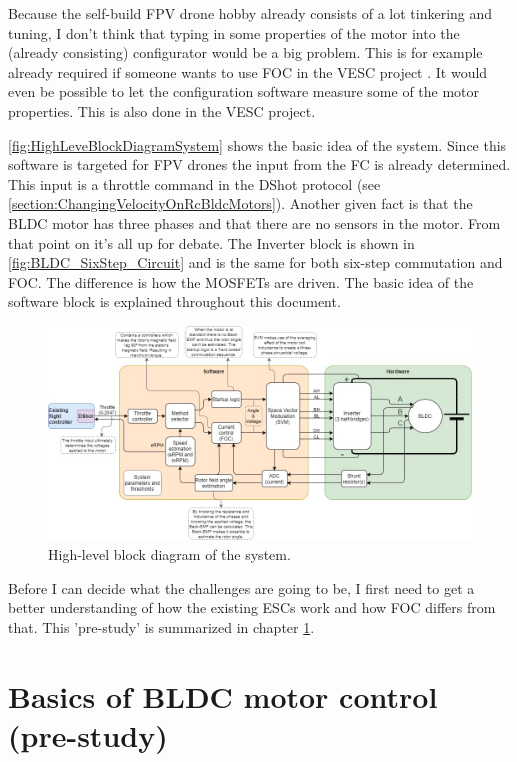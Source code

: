 \documentclass[]{report}
\begin{document}
Because the self-build FPV drone hobby already consists of a lot tinkering and tuning, I don't think that typing in some properties of the motor into the (already consisting) configurator would be a big problem. This is for example already required if someone wants to use FOC in the VESC project \cite{VESC_project_FOC_wizard}. It would even be possible to let the configuration software measure some of the motor properties. This is also done in the VESC project.

\autoref{fig:HighLeveBlockDiagramSystem} shows the basic idea of the system. Since this software is targeted for FPV drones the input from the FC is already determined. This input is a throttle command in the DShot protocol (see \ref{section:ChangingVelocityOnRcBldcMotors}). Another given fact is that the BLDC motor has three phases and that there are no sensors in the motor. From that point on it's all up for debate. The Inverter block is shown in \autoref{fig:BLDC_SixStep_Circuit} and is the same for both six-step commutation and FOC. The difference is how the MOSFETs are driven. The basic idea of the software block is explained throughout this document. 

\begin{figure}[h]
	\includegraphics[width=\textwidth]{Draw_IO/BlockDiagram.jpg}
	\caption{High-level block diagram of the system.}
	\label{fig:HighLeveBlockDiagramSystem}
\end{figure}

Before I can decide what the challenges are going to be, I first need to get a better understanding of how the existing ESCs work and how FOC differs from that. This 'pre-study' is summarized in chapter \ref{chapter:Basics_of_BLDC_motor_control}.

\chapter{Basics of BLDC motor control (pre-study)} \label{chapter:Basics_of_BLDC_motor_control}
\end{document}
